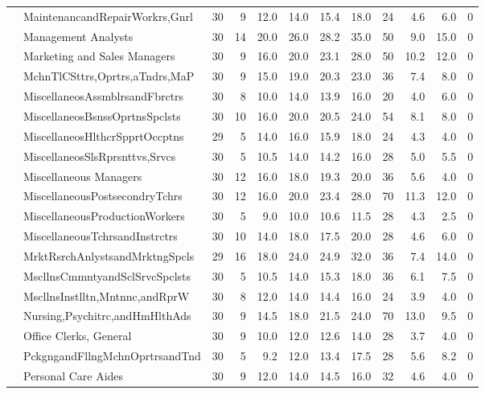 {\begin{longtable}{llrrrrrrrrrr}
   & MaintenancandRepairWorkrs,Gnrl &   30 &  9 & 12.0 & 14.0 & 15.4 & 18.0 & 24 &  4.6 &  6.0 & 0 \\ 
   & Management Analysts &   30 & 14 & 20.0 & 26.0 & 28.2 & 35.0 & 50 &  9.0 & 15.0 & 0 \\ 
   & Marketing and Sales Managers &   30 &  9 & 16.0 & 20.0 & 23.1 & 28.0 & 50 & 10.2 & 12.0 & 0 \\ 
   & MchnTlCSttrs,Oprtrs,aTndrs,MaP &   30 &  9 & 15.0 & 19.0 & 20.3 & 23.0 & 36 &  7.4 &  8.0 & 0 \\ 
   & MiscellaneosAssmblrsandFbrctrs &   30 &  8 & 10.0 & 14.0 & 13.9 & 16.0 & 20 &  4.0 &  6.0 & 0 \\ 
   & MiscellaneosBsnssOprtnsSpclsts &   30 & 10 & 16.0 & 20.0 & 20.5 & 24.0 & 54 &  8.1 &  8.0 & 0 \\ 
   & MiscellaneosHlthcrSpprtOccptns &   29 &  5 & 14.0 & 16.0 & 15.9 & 18.0 & 24 &  4.3 &  4.0 & 0 \\ 
   & MiscellaneosSlsRprsnttvs,Srvcs &   30 &  5 & 10.5 & 14.0 & 14.2 & 16.0 & 28 &  5.0 &  5.5 & 0 \\ 
   & Miscellaneous Managers &   30 & 12 & 16.0 & 18.0 & 19.3 & 20.0 & 36 &  5.6 &  4.0 & 0 \\ 
   & MiscellaneousPostsecondryTchrs &   30 & 12 & 16.0 & 20.0 & 23.4 & 28.0 & 70 & 11.3 & 12.0 & 0 \\ 
   & MiscellaneousProductionWorkers &   30 &  5 &  9.0 & 10.0 & 10.6 & 11.5 & 28 &  4.3 &  2.5 & 0 \\ 
   & MiscellaneousTchrsandInstrctrs &   30 & 10 & 14.0 & 18.0 & 17.5 & 20.0 & 28 &  4.6 &  6.0 & 0 \\ 
   & MrktRsrchAnlystsandMrktngSpcls &   29 & 16 & 18.0 & 24.0 & 24.9 & 32.0 & 36 &  7.4 & 14.0 & 0 \\ 
   & MscllnsCmmntyandSclSrvcSpclsts &   30 &  5 & 10.5 & 14.0 & 15.3 & 18.0 & 36 &  6.1 &  7.5 & 0 \\ 
   & MscllnsInstlltn,Mntnnc,andRprW &   30 &  8 & 12.0 & 14.0 & 14.4 & 16.0 & 24 &  3.9 &  4.0 & 0 \\ 
   & Nursing,Psychitrc,andHmHlthAds &   30 &  9 & 14.5 & 18.0 & 21.5 & 24.0 & 70 & 13.0 &  9.5 & 0 \\ 
   & Office Clerks, General &   30 &  9 & 10.0 & 12.0 & 12.6 & 14.0 & 28 &  3.7 &  4.0 & 0 \\ 
   & PckgngandFllngMchnOprtrsandTnd &   30 &  5 &  9.2 & 12.0 & 13.4 & 17.5 & 28 &  5.6 &  8.2 & 0 \\ 
   & Personal Care Aides &   30 &  9 & 12.0 & 14.0 & 14.5 & 16.0 & 32 &  4.6 &  4.0 & 0 \\ 

\end{longtable}}
